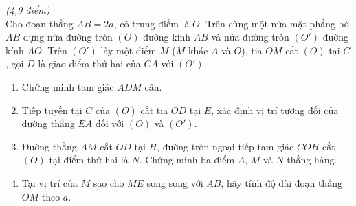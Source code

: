 \begin{ex}{\it{(4,0 điểm)}}\\
Cho  đoạn thẳng $AB = 2a$, có  trung điểm là $O$. Trên cùng một nửa mặt phẳng bờ $AB$  dựng nửa đường tròn $\left(O\right)$ đường kính $AB$ và nửa đường tròn $\left(O'\right)$ đường kính $AO$. Trên $\left(O'\right)$ lấy một điểm $M$ ($M$ khác $A$ và $O$), tia $OM$ cắt $\left(O\right)$ tại $C$, gọi $D$ là giao điểm thứ hai của $CA$ với $\left(O'\right)$. 
\begin{enumerate}	
\item Chứng minh tam giác $ADM$ cân. 
\item Tiếp tuyến tại $C$ của $\left(O\right)$ cắt tia $OD$ tại $E$, xác định vị trí tương đối của đường thẳng $EA$ đối với $\left(O\right)$ và $\left(O'\right)$.
\item Đường thẳng $AM$  cắt $OD$ tại $H$, đường tròn ngoại tiếp tam giác $COH$ cắt $\left(O\right)$ tại điểm thứ hai là $N$. Chứng minh ba điểm $A$, $M$ và $N$ thẳng hàng.
\item  Tại vị trí của $M$ sao cho $ME$ song song với $AB$, hãy tính độ dài đoạn thẳng $OM$ theo $a$.
\end{enumerate}
\end{ex}
